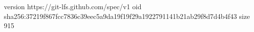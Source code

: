 version https://git-lfs.github.com/spec/v1
oid sha256:37219f867fcc7836c39eec5a9da19f19f29a1922791141b21ab29f8d7d4b4f43
size 915
